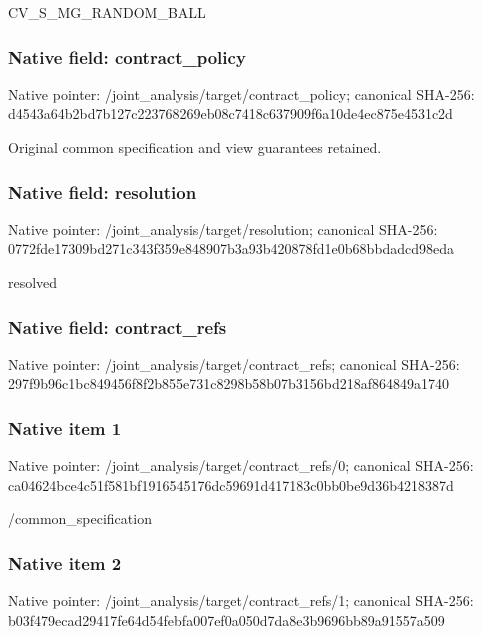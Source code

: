 \documentclass[10pt,a4paper]{article}
\begin{document}
CV\_S\_MG\_RANDOM\_BALL


\subsubsection{Native field: contract\_policy}


Native pointer: /joint\_analysis/target/contract\_policy; canonical SHA-256: d4543a64b2bd7b127c223768\allowbreak{}269eb08c7418c637909f6a10\allowbreak{}de4ec875e4531c2d


Original common specification and view guarantees retained.


\subsubsection{Native field: resolution}


Native pointer: /joint\_analysis/target/resolution; canonical SHA-256: 0772fde17309bd271c343f35\allowbreak{}9e848907b3a93b420878fd1e\allowbreak{}0b68bbdadcd98eda


resolved


\subsubsection{Native field: contract\_refs}


Native pointer: /joint\_analysis/target/contract\_refs; canonical SHA-256: 297f9b96c1bc849456f8f2b8\allowbreak{}55e731c8298b58b07b3156bd\allowbreak{}218af864849a1740



\subsubsection{Native item 1}


Native pointer: /joint\_analysis/target/contract\_refs/0; canonical SHA-256: ca04624bce4c51f581bf1916\allowbreak{}545176dc59691d417183c0bb\allowbreak{}0be9d36b4218387d


/common\_specification


\subsubsection{Native item 2}


Native pointer: /joint\_analysis/target/contract\_refs/1; canonical SHA-256: b03f479ecad29417fe64d54f\allowbreak{}ebfa007ef0a050d7da8e3b96\allowbreak{}96bb89a91557a509
\end{document}
